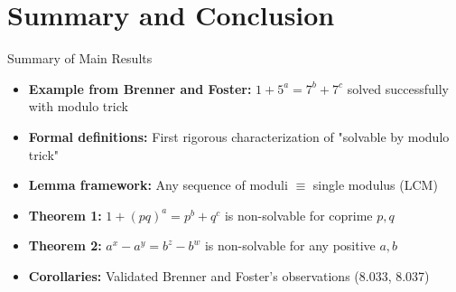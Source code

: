 ﻿\documentclass[10pt,aspectratio=169]{beamer}
\begin{document}
\section{Summary and Conclusion}

\begin{frame}{Summary of Main Results}
    \begin{itemize}
        \item \textbf{Example from Brenner and Foster:} $1+5^a = 7^b+7^c$ solved successfully with modulo trick
        
        \item \textbf{Formal definitions:} First rigorous characterization of "solvable by modulo trick"
        
        \item \textbf{Lemma framework:} Any sequence of moduli $\equiv$ single modulus (LCM)
        
        \item \textbf{Theorem 1:} $1+(pq)^a = p^b+q^c$ is non-solvable for coprime $p,q$
        
        \item \textbf{Theorem 2:} $a^x-a^y = b^z-b^w$ is non-solvable for any positive $a,b$
        
        \item \textbf{Corollaries:} Validated Brenner and Foster's observations (8.033, 8.037)
    \end{itemize}
\end{frame}
\end{document}
